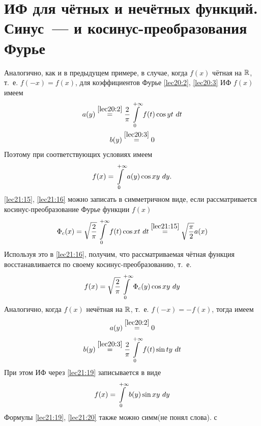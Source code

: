 \documentclass[../../main.tex]{subfiles}
\begin{document}
\section{ИФ для чётных и нечётных функций. Синус~--- и косинус-преобразования 
Фурье}

Аналогично, как и в предыдущем примере, в случае, 
когда $ f(x) $ чётная на $ \mathbb{R} $, т.~е. $ f(-x) = f(x) $, для коэффициентов 
Фурье
\eqref{lec20:2}, \eqref{lec20:3} ИФ $ f(x) $ имеем 
\begin{equation}
\label{lec21:15}
\begin{gathered}
a(y) \stackrel{\eqref{lec20:2}}{=}
\dfrac{2}{\pi} \int\limits_{0}^{+\infty} f(t) \cos yt\ dt\\
b(y) \stackrel{\eqref{lec20:3}}{=} 0
\end{gathered}
\end{equation}
Поэтому при соответствующих условиях имеем 
\begin{equation}
\label{lec21:16}
f(x) = \int\limits_{0}^{+\infty} a(y) \cos xy\ dy.
\end{equation}
\eqref{lec21:15}, \eqref{lec21:16} можно записать в симметричном виде, если 
рассматривается косинус-преобразование Фурье функции $ f(x) $
\[
\Phi_c(x) = \sqrt{\dfrac{2}{\pi}} \int\limits_{0}^{+\infty} f(t) \cos xt\ dt
\stackrel{\eqref{lec21:15}}{=} \sqrt{\dfrac{\pi}{2}}a(x)
\]
Используя это в \eqref{lec21:16}, получим, что рассматриваемая
чётная функция восстанавливается по своему косинус-преобразованию, т.~е.
\[
f(x) = \sqrt{\dfrac{2}{\pi}} \int\limits_{0}^{+\infty} \Phi_c(y) \cos xy\ dy
\]
Аналогично, когда $ f(x) $ нечётная на $ \mathbb{R} $, т.~е.
$ f(-x) = -f(x) $, тогда имеем 
\begin{equation}
\label{lec21:18}
a(y) \stackrel{\eqref{lec20:2}}{=} 0
\end{equation}
\begin{equation}
\label{lec21:19}
b(y) \stackrel{\eqref{lec20:3}}{=}
\dfrac{2}{\pi}
\int\limits_{0}^{+\infty} f(t) \sin ty\ dt
\end{equation}
При этом ИФ через \eqref{lec21:19} записывается в виде
\begin{equation}
\label{lec21:20}
f(x) = \int\limits_{0}^{+\infty} b(y) \sin xy\ dy
\end{equation}
Формулы \eqref{lec21:19}, \eqref{lec21:20} также можно симм(не понял слова). с 
\end{document}

